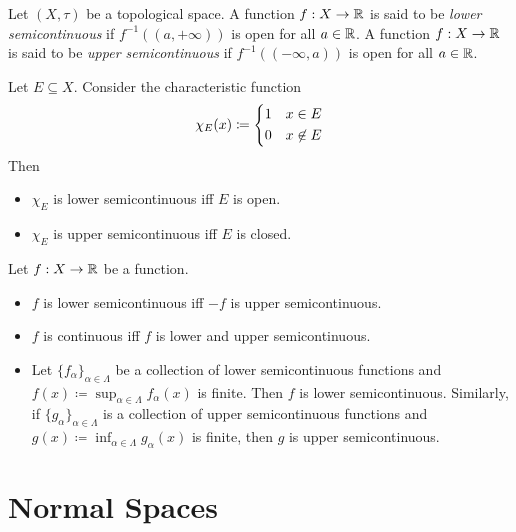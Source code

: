 \documentclass[screen]{techreport}
\numberwithin{equation}{section}
\begin{document}
\begin{definition}\label{De:SemiCont}
	Let $(X,\tau)$ be a topological space.
	A function $f : X \to \mathbb{R}$ is said to be \emph{lower semicontinuous} if $f^{-1}((a,+\infty))$ is open for all $a \in \mathbb{R}$.
	A function $f : X \to \mathbb{R}$ is said to be \emph{upper semicontinuous} if $f^{-1}((-\infty,a))$ is open for all $a \in \mathbb{R}$.
\end{definition}

\begin{example}\label{Exa:IndicatorsSemiCont}
	Let $E \subseteq X$.
	Consider the characteristic function
	\[
	\chi_E(x) \coloneqq
	\begin{dcases}
 		1 & x \in E \\
 		0 & x \not\in E
 	\end{dcases}
	\]
	Then
	\begin{itemize}
		\item $\chi_E$ is lower semicontinuous iff $E$ is open.
		\item $\chi_E$ is upper semicontinuous iff $E$ is closed.
	\end{itemize} 	
\end{example}

\begin{lemma}\label{Lem:SomeFactsAboutSemiCont}
	Let $f : X \to \mathbb{R}$ be a function.
	\begin{itemize}
		\item $f$ is lower semicontinuous iff $-f$ is upper semicontinuous.
		\item $f$ is continuous iff $f$ is lower and upper semicontinuous.
		\item Let $\{f_\alpha\}_{\alpha \in \Lambda}$ be a collection of lower semicontinuous functions and $f(x) \coloneqq \sup_{\alpha \in \Lambda} f_{\alpha}(x)$ is finite.
		Then $f$ is lower semicontinuous.
		Similarly, if $\{g_\alpha\}_{\alpha \in \Lambda}$ is a collection of upper semicontinuous functions and $g(x) \coloneqq \inf_{\alpha \in \Lambda} g_\alpha(x)$ is finite, then $g$ is upper semicontinuous.
	\end{itemize}
\end{lemma}

\section{Normal Spaces}
\end{document}
